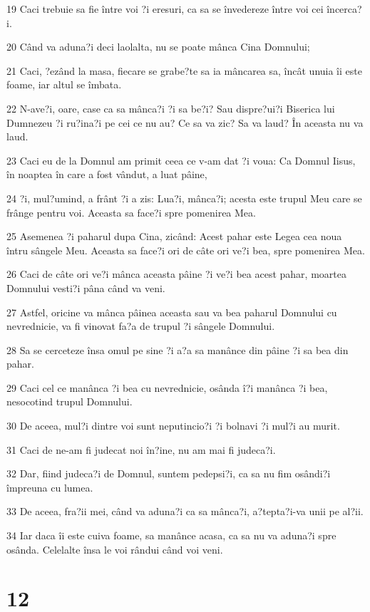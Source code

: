 \par 19 Caci trebuie sa fie între voi ?i eresuri, ca sa se învedereze între voi cei încerca?i.
\par 20 Când va aduna?i deci laolalta, nu se poate mânca Cina Domnului;
\par 21 Caci, ?ezând la masa, fiecare se grabe?te sa ia mâncarea sa, încât unuia îi este foame, iar altul se îmbata.
\par 22 N-ave?i, oare, case ca sa mânca?i ?i sa be?i? Sau dispre?ui?i Biserica lui Dumnezeu ?i ru?ina?i pe cei ce nu au? Ce sa va zic? Sa va laud? În aceasta nu va laud.
\par 23 Caci eu de la Domnul am primit ceea ce v-am dat ?i voua: Ca Domnul Iisus, în noaptea în care a fost vândut, a luat pâine,
\par 24 ?i, mul?umind, a frânt ?i a zis: Lua?i, mânca?i; acesta este trupul Meu care se frânge pentru voi. Aceasta sa face?i spre pomenirea Mea.
\par 25 Asemenea ?i paharul dupa Cina, zicând: Acest pahar este Legea cea noua întru sângele Meu. Aceasta sa face?i ori de câte ori ve?i bea, spre pomenirea Mea.
\par 26 Caci de câte ori ve?i mânca aceasta pâine ?i ve?i bea acest pahar, moartea Domnului vesti?i pâna când va veni.
\par 27 Astfel, oricine va mânca pâinea aceasta sau va bea paharul Domnului cu nevrednicie, va fi vinovat fa?a de trupul ?i sângele Domnului.
\par 28 Sa se cerceteze însa omul pe sine ?i a?a sa manânce din pâine ?i sa bea din pahar.
\par 29 Caci cel ce manânca ?i bea cu nevrednicie, osânda î?i manânca ?i bea, nesocotind trupul Domnului.
\par 30 De aceea, mul?i dintre voi sunt neputincio?i ?i bolnavi ?i mul?i au murit.
\par 31 Caci de ne-am fi judecat noi în?ine, nu am mai fi judeca?i.
\par 32 Dar, fiind judeca?i de Domnul, suntem pedepsi?i, ca sa nu fim osândi?i împreuna cu lumea.
\par 33 De aceea, fra?ii mei, când va aduna?i ca sa mânca?i, a?tepta?i-va unii pe al?ii.
\par 34 Iar daca îi este cuiva foame, sa manânce acasa, ca sa nu va aduna?i spre osânda. Celelalte însa le voi rândui când voi veni.

\chapter{12}


